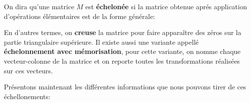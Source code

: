 On dira qu'une matrice \(M\) est \textbf{échelonée} si la matrice obtenue aprés application d'opérations élémentaires est de la forme générale:
\begin{center}
\end{center}
En d'autres termes, on \textbf{creuse} la matrice pour faire apparaître des zéros sur la partie triangulaire supérieure.\+
Il existe aussi une variante appellé \textbf{échelonnement avec mémorisation}, pour cette variante, on nomme chaque vecteur-colonne de la matrice et on reporte toutes les transformations réalisées sur ces vecteurs. \<

Présentons maintenant les différentes informations que nous pouvons tirer de ces échellonements:

